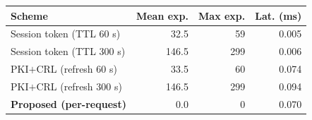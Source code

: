 \begin{tabular}{@{}lrrr@{}}
\toprule
\textbf{Scheme} & \textbf{Mean exp.} & \textbf{Max exp.} & \textbf{Lat. (ms)} \\
\midrule
Session token (TTL 60 s) & 32.5 & 59 & 0.005 \\
Session token (TTL 300 s) & 146.5 & 299 & 0.006 \\
PKI$+$CRL (refresh 60 s) & 33.5 & 60 & 0.074 \\
PKI$+$CRL (refresh 300 s) & 146.5 & 299 & 0.094 \\
\textbf{Proposed (per-request)} & 0.0 & 0 & 0.070 \\
\bottomrule
\end{tabular}